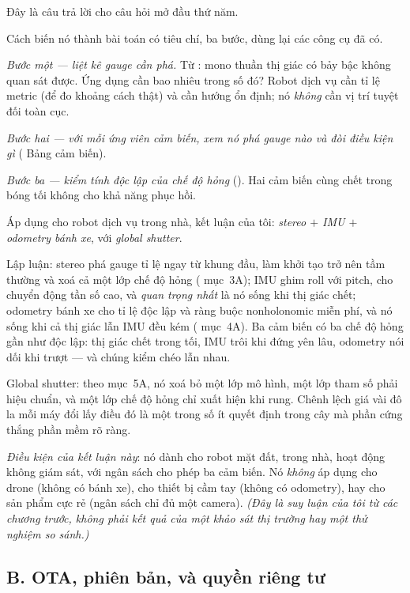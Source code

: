 \documentclass[../../vslam.tex]{subfiles}
\begin{document}
Đây là câu trả lời cho câu hỏi mở đầu thứ năm.

Cách biến nó thành bài toán có tiêu chí, ba bước, dùng lại các công cụ đã có.

\emph{Bước một --- liệt kê gauge cần phá.} Từ : mono thuần thị giác có bảy bậc không quan sát được. Ứng dụng cần bao nhiêu trong số đó? Robot dịch vụ cần tỉ lệ metric (để đo khoảng cách thật) và cần hướng ổn định; nó \emph{không} cần vị trí tuyệt đối toàn cục.

\emph{Bước hai --- với mỗi ứng viên cảm biến, xem nó phá gauge nào và đòi điều kiện gì} ( Bảng cảm biến).

\emph{Bước ba --- kiểm tính độc lập của chế độ hỏng} (). Hai cảm biến cùng chết trong bóng tối không cho khả năng phục hồi.

Áp dụng cho robot dịch vụ trong nhà, kết luận của tôi: \emph{stereo \(+\) IMU \(+\) odometry bánh xe}, với \emph{global shutter}.

Lập luận: stereo phá gauge tỉ lệ ngay từ khung đầu, làm khởi tạo trở nên tầm thường và xoá cả một lớp chế độ hỏng ( mục~3A); IMU ghim roll với pitch, cho chuyển động tần số cao, và \emph{quan trọng nhất} là nó sống khi thị giác chết; odometry bánh xe cho tỉ lệ độc lập và ràng buộc nonholonomic miễn phí, và nó sống khi cả thị giác lẫn IMU đều kém ( mục~4A). Ba cảm biến có ba chế độ hỏng gần như độc lập: thị giác chết trong tối, IMU trôi khi đứng yên lâu, odometry nói dối khi trượt --- và chúng kiểm chéo lẫn nhau.

Global shutter: theo  mục~5A, nó xoá bỏ một lớp mô hình, một lớp tham số phải hiệu chuẩn, và một lớp chế độ hỏng chỉ xuất hiện khi rung. Chênh lệch giá vài đô la mỗi máy đổi lấy điều đó là một trong số ít quyết định trong cây mà phần cứng thắng phần mềm rõ ràng.

\emph{Điều kiện của kết luận này}: nó dành cho robot mặt đất, trong nhà, hoạt động không giám sát, với ngân sách cho phép ba cảm biến. Nó \emph{không} áp dụng cho drone (không có bánh xe), cho thiết bị cầm tay (không có odometry), hay cho sản phẩm cực rẻ (ngân sách chỉ đủ một camera). \emph{(Đây là suy luận của tôi từ các chương trước, không phải kết quả của một khảo sát thị trường hay một thử nghiệm so sánh.)}

\subsection{B. OTA, phiên bản, và quyền riêng tư}
\end{document}
